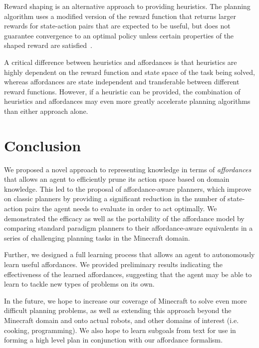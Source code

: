 \documentclass[conference]{IEEEtran}
\begin{document}
Reward shaping is an alternative approach to providing heuristics. The planning algorithm uses a modified version of the reward function that returns larger rewards for state-action pairs that are expected to be useful, but does not guarantee convergence to an optimal policy unless certain properties of the shaped reward are satisfied~\citep{potshap}.

A critical difference between heuristics and affordances is that heuristics are highly dependent on the reward function and state space of the task being solved, whereas affordances are state independent and transferable between different reward functions. However, if a heuristic can be provided, the combination of heuristics and affordances may even more greatly accelerate planning algorithms than either approach alone.

\section{Conclusion}
\label{sec:conclusion}

We proposed a novel approach to representing knowledge in terms of
{\em affordances}~\citep{gibson77} that allows an agent to efficiently
prune its action space based on domain knowledge. This led to the 
proposal of affordance-aware planners, which improve on classic planners
by providing a significant reduction in the number of state-action pairs the
agent needs to evaluate in order to act optimally. We demonstrated the efficacy 
as well as the portability of the affordance model by comparing standard paradigm
planners to their affordance-aware equivalents in a series of challenging planning tasks in the Minecraft
domain.

Further, we designed a full learning process that allows an agent to autonomously learn useful affordances.
We provided preliminary results indicating the effectiveness of the learned affordances, suggesting that
the agent may be able to learn to tackle new types of problems on its own.

In the future, we hope to increase our coverage of Minecraft to solve even more difficult planning problems, as well as
extending this approach beyond the Minecraft domain and onto actual robots, and other domains of interest (i.e. cooking, programming). We also hope
to learn subgoals from text for use in forming a high level plan in conjunction with our affordance formalism.

\end{document}
